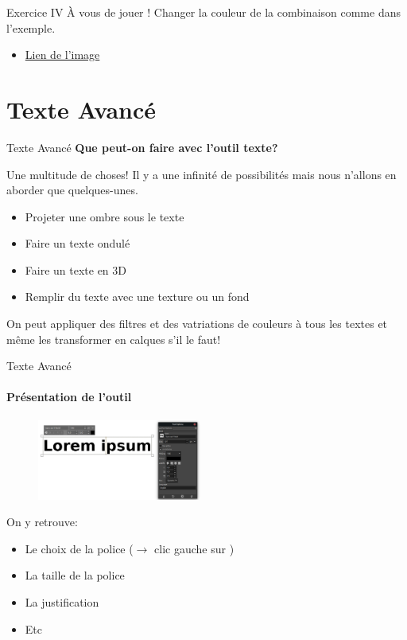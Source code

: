 \documentclass[10pt,svgnames,usenames,table]{beamer}
\newlength\myheight
\newlength\mydepth
\newcommand*\inlinegraphics[1]{%
  \settototalheight\myheight{Xygp}%
  \settodepth\mydepth{Xygp}%
  \raisebox{-\mydepth}{\texttt{[image: \#1]}}%
}
\begin{document}
	\begin{frame}{Exercice IV}
		À vous de jouer ! Changer la couleur de la combinaison comme dans l'exemple.
		\begin{itemize}
			\item \href{http://louvainlinux.github.io/atelier-gimp/src/Images/colours/col5.jpg}{Lien de l'image}
		\end{itemize}
	\end{frame}




\section{Texte Avancé}
	\begin{frame}{Texte Avancé}
		\textbf{Que peut-on faire avec l'outil texte?}		

		Une multitude de choses! Il y a une infinité de possibilités mais nous n'allons en aborder que quelques-unes.
		\begin{itemize}
			\item Projeter une ombre sous le texte
			\item Faire un texte ondulé
			\item Faire un texte en 3D
			\item Remplir du texte avec une texture ou un fond
		\end{itemize}
		
		On peut appliquer des filtres et des vatriations de couleurs à tous les textes et même les transformer en calques s'il le faut!
	\end{frame}

\begin{frame}{Texte Avancé}
	\framesubtitle{Présentation de l'outil}
	\begin{figure}
		\centering
		\includegraphics[height=100px]{Images/text/text}
	\end{figure}
	On y retrouve:
	\begin{itemize}
	\item Le choix de la police ($\rightarrow$ clic gauche sur  \inlinegraphics{Images/text/font} )
	\item La taille de la police
	\item La justification
	\item Etc
	\end{itemize}
\end{frame}
\end{document}
